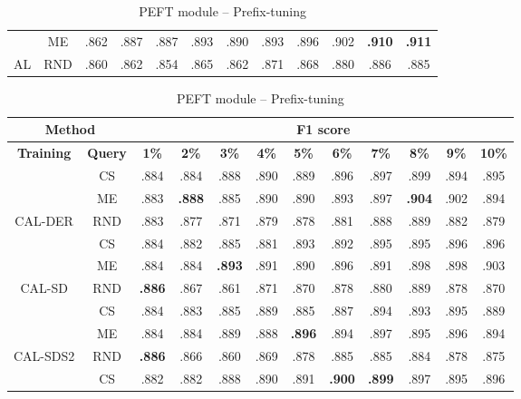 \begin{table}[htbp]
\begin{subtable}{\linewidth}
\begin{tabular}{c|c|cccccccccc}
 & ME & .862 & .887 & .887 & .893 & .890 & .893 & .896 & .902 & \textbf{.910} & \textbf{.911}\\

\multirow{-3}{*}{\raggedright\arraybackslash AL} & RND & .860 & .862 & .854 & .865 & .862 & .871 & .868 & .880 & .886 & .885\\
\bottomrule
\end{tabular}
\end{subtable}
\vspace{1em}
\begin{subtable}{\linewidth}
\centering
\caption{PEFT module -- Prefix-tuning}

\begin{tabular}{c|c|cccccccccc}
\toprule
\multicolumn{2}{c|}{\textbf{Method}} & \multicolumn{10}{c}{\textbf{F1 score}} \\
\midrule
\textbf{Training} & \textbf{Query} & \textbf{1\%} & \textbf{2\%} & \textbf{3\%} & \textbf{4\%} & \textbf{5\%} & \textbf{6\%} & \textbf{7\%} & \textbf{8\%} & \textbf{9\%} & \textbf{10\%}\\
\midrule
 & CS & .884 & .884 & .888 & .890 & .889 & .896 & .897 & .899 & .894 & .895\\

 & ME & .883 & \textbf{.888} & .885 & .890 & .890 & .893 & .897 & \textbf{.904} & .902 & .894\\

\multirow{-3}{*}{\raggedright\arraybackslash CAL-DER} & RND & .883 & .877 & .871 & .879 & .878 & .881 & .888 & .889 & .882 & .879\\
\midrule
 & CS & .884 & .882 & .885 & .881 & .893 & .892 & .895 & .895 & .896 & .896\\

 & ME & .884 & .884 & \textbf{.893} & .891 & .890 & .896 & .891 & .898 & .898 & .903\\

\multirow{-3}{*}{\raggedright\arraybackslash CAL-SD} & RND & \textbf{.886} & .867 & .861 & .871 & .870 & .878 & .880 & .889 & .878 & .870\\
\midrule
 & CS & .884 & .883 & .885 & .889 & .885 & .887 & .894 & .893 & .895 & .889\\

 & ME & .884 & .884 & .889 & .888 & \textbf{.896} & .894 & .897 & .895 & .896 & .894\\

\multirow{-3}{*}{\raggedright\arraybackslash CAL-SDS2} & RND & \textbf{.886} & .866 & .860 & .869 & .878 & .885 & .885 & .884 & .878 & .875\\
\midrule
 & CS & .882 & .882 & .888 & .890 & .891 & \textbf{.900} & \textbf{.899} & .897 & .895 & .896\\


\end{tabular}
\end{subtable}
\end{table}
